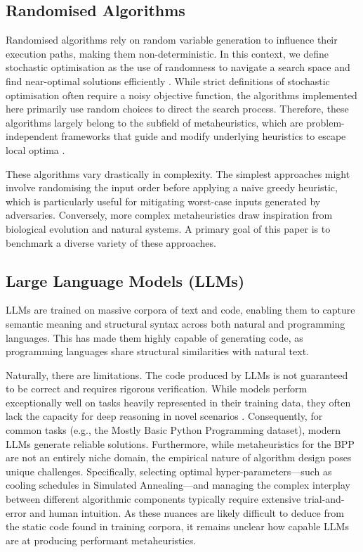 \documentclass[11pt]{article}
\begin{document}
\subsection{Randomised Algorithms}
Randomised algorithms rely on random variable generation to influence their execution paths, making them non-deterministic. In this context, we define stochastic optimisation as the use of randomness to navigate a search space and find near-optimal solutions efficiently \cite{sean}. While strict definitions of stochastic optimisation often require a noisy objective function, the algorithms implemented here primarily use random choices to direct the search process. Therefore, these algorithms largely belong to the subfield of metaheuristics, which are problem-independent frameworks that guide and modify underlying heuristics to escape local optima \cite{yang}. 

These algorithms vary drastically in complexity. The simplest approaches might involve randomising the input order before applying a naive greedy heuristic, which is particularly useful for mitigating worst-case inputs generated by adversaries. Conversely, more complex metaheuristics draw inspiration from biological evolution and natural systems. A primary goal of this paper is to benchmark a diverse variety of these approaches.

\subsection{Large Language Models (LLMs)}
LLMs are trained on massive corpora of text and code, enabling them to capture semantic meaning and structural syntax across both natural and programming languages. This has made them highly capable of generating code, as programming languages share structural similarities with natural text.

Naturally, there are limitations. The code produced by LLMs is not guaranteed to be correct and requires rigorous verification. While models perform exceptionally well on tasks heavily represented in their training data, they often lack the capacity for deep reasoning in novel scenarios \cite{kucharavy}. Consequently, for common tasks (e.g., the Mostly Basic Python Programming dataset), modern LLMs generate reliable solutions. Furthermore, while metaheuristics for the BPP are not an entirely niche domain, the empirical nature of algorithm design poses unique challenges. Specifically, selecting optimal hyper-parameters---such as cooling schedules in Simulated Annealing---and managing the complex interplay between different algorithmic components typically require extensive trial-and-error and human intuition. As these nuances are likely difficult to deduce from the static code found in training corpora, it remains unclear how capable LLMs are at producing performant metaheuristics.
\end{document}
